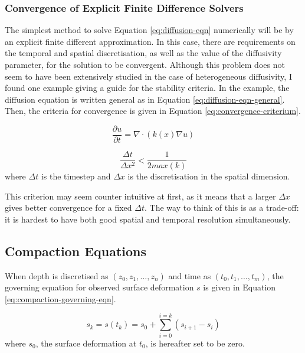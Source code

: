 \documentclass{article}
\begin{document}
\subsubsection{Convergence of Explicit Finite Difference Solvers}

The simplest method to solve Equation \ref{eq:diffusion-eqn} numerically will be by an explicit finite different approximation. In this case, there are requirements on the temporal and spatial discretisation, as well as the value of the diffusivity parameter, for the solution to be convergent. Although this problem does not seem to have been extensively studied in the case of heterogeneous diffusivity, I found one example giving a guide for the stability criteria. In the example, the diffusion equation is written general as in Equation \ref{eq:diffusion-eqn-general}. Then, the criteria for convergence is given in Equation \ref{eq:convergence-criterium}.

\begin{equation}
\frac{\partial u}{\partial t} = \nabla \cdot (k(x) \nabla u)
\label{eq:diffusion-eqn-general}
\end{equation}

\begin{equation}
\frac{\Delta t}{\Delta x ^2} < \frac{1}{2 max(k)}
\label{eq:convergence-criterium}
\end{equation}
where $\Delta t$ is the timestep and $\Delta x$ is the discretisation in the spatial dimension.

This criterion may seem counter intuitive at first, as it means that a larger $\Delta x$ gives better convergence for a fixed $\Delta t$. The way to think of this is as a trade-off: it is hardest to have both good spatial and temporal resolution simultaneously.

\subsection{Compaction Equations}

When depth is discretised as $(z_0, z_1, ..., z_n)$ and time as $(t_0, t_1, ..., t_m)$, the governing equation for observed surface deformation $s$ is given in Equation \ref{eq:compaction-governing-eqn}.

\begin{equation}
s_k = s(t_k) = s_0 + \sum_{i=0}^{i=k} (s_{i+1} - s_i)
\label{eq:compaction-governing-eqn}
\end{equation}
where $s_0$, the surface deformation at $t_0$, is hereafter set to be zero.
\end{document}
